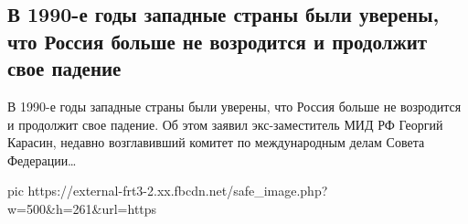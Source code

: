  
 
 
 
 
\subsection{В 1990-е годы западные страны были уверены, что Россия больше не возродится и продолжит свое падение}
\label{sec:12_04_2021.fb.stopgosdep.1.rossia}

В 1990-е годы западные страны были уверены, что Россия больше не возродится и
продолжит свое падение.  Об этом заявил экс-заместитель МИД РФ Георгий Карасин,
недавно возглавивший комитет по международным делам Совета Федерации…

\ifcmt
  pic https://external-frt3-2.xx.fbcdn.net/safe_image.php?w=500&h=261&url=https%
\fi

